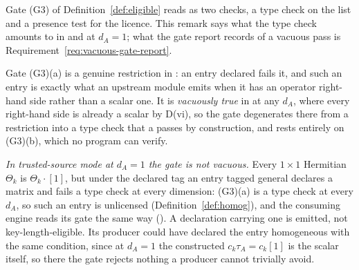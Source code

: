 
Gate (G3) of Definition~\ref{def:eligible} reads as two checks, a type check
on the list and a presence test for the licence. This remark says what the
type check amounts to in  and at $d_A=1$; what the gate
report records of a vacuous pass is Requirement~\ref{req:vacuous-gate-report}.

\begin{remark}\label{rem:degenerate}
Gate (G3)(a) is a genuine restriction in : an entry
declared  fails it, and such an entry is exactly what an
upstream module emits when it has an operator right-hand side rather than a
scalar one. It is \emph{vacuously true} in  at any
$d_A$, where every right-hand side is already a scalar by D(vi), so the gate
degenerates there from a restriction into a type check that a
 passes by construction, and rests entirely on
(G3)(b), which no program can verify.

\emph{In trusted-source mode at $d_A=1$ the gate is not vacuous.} Every
$1\times1$ Hermitian $\Theta_k$ is $\Theta_k\cdot[1]$, but under the declared
tag an entry tagged general declares a matrix and fails a type check at every
dimension: (G3)(a) is a type check at every $d_A$, so such an entry is
unlicensed (Definition~\ref{def:homog}), and the consuming engine reads its
gate the same way (). A declaration carrying one is
emitted, not key-length-eligible. Its producer could have declared the entry
homogeneous with the same condition, since at $d_A=1$ the constructed
$c_k\tau_A=c_k[1]$ is the scalar itself, so there the gate rejects nothing a
producer cannot trivially avoid.
\end{remark}
